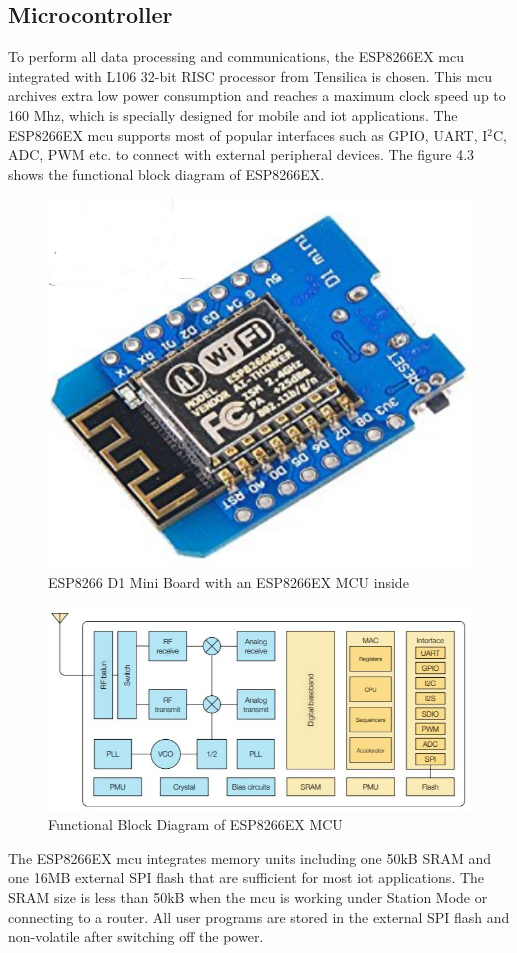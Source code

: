 \documentclass[letterpaper,12pt,titlepage,oneside,final]{book}
\let\origdoublepage\cleardoublepage
\newcommand{\clearemptydoublepage}{%
	\clearpage{\pagestyle{empty}\origdoublepage}}
\let\cleardoublepage\clearemptydoublepage
\begin{document}
\subsection{Microcontroller}
To perform all data processing and communications, the ESP8266EX \gls{mcu} integrated with L106 32-bit RISC processor from Tensilica is chosen. This \gls{mcu} archives extra low power consumption and reaches a maximum clock speed up to 160 Mhz, which is specially designed for mobile and \gls{iot} applications. The ESP8266EX \gls{mcu} supports most of popular interfaces such as GPIO, UART, I$^{2}$C, ADC, PWM etc. to connect with external peripheral devices. The figure 4.3 shows the functional block diagram of ESP8266EX. \par 
\begin{figure}[h]
	\centering
	\includegraphics[scale=0.5]{esp8266}
	\caption{ESP8266 D1 Mini Board with an ESP8266EX MCU inside}
\end{figure}
\cleardoublepage
\begin{figure}[h]
	\centering
	\includegraphics[scale=0.8]{functional_diagram}
	\caption{Functional Block Diagram of ESP8266EX MCU}
\end{figure}
The ESP8266EX \gls{mcu} integrates memory units including one 50kB SRAM and one 16MB external SPI flash that are sufficient for most \gls{iot} applications. The SRAM size is less than 50kB when the \gls{mcu} is working under Station Mode or connecting to a router. All user programs are stored in the external SPI flash and non-volatile after switching off the power.
\end{document}

